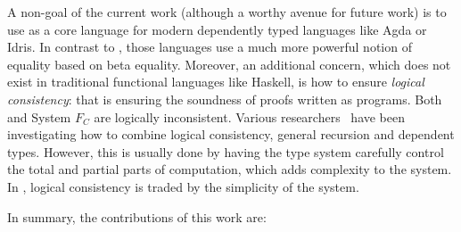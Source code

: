 A non-goal of the current work (although a worthy avenue for future
work) is to use \name as a core language for modern dependently typed
languages like Agda or Idris. In contrast to \name, those languages
use a much more powerful notion of equality based on beta equality.  Moreover, an
additional concern, which does not exist in traditional functional
languages like Haskell, is how to ensure \emph{logical consistency}:
that is ensuring the soundness of proofs written as programs. Both
\name and System $F_{C}$ are logically inconsistent.
Various researchers~\cite{zombie:popl14,zombie:thesis,Swamy2011} have been investigating how to combine logical
consistency, general recursion and dependent types. However, this is
usually done by having the type system carefully control the total and
partial parts of computation, which adds complexity to the system. In
\name, logical consistency is traded by the simplicity of the system.

\begin{comment}
In particular
the treatment of type-level computation in \name shares similar ideas
with Haskell. Although Haskell's surface language provides a rich set
of mechanisms to do type-level computation~\cite{}, the core language
lacks fundamental mechanisms todo type-level computation. Type
equality in System $F_{C}$ is, like in \name, purely syntactic (modulo
alpha-conversion).
\end{comment}

\begin{comment}
 and there is no type-level
abstraction. In other words in Haskell, mechanisms such as type
classes and type families

Although it may seem that forcing each step of computation 
at the type-level to be explicit will prevent convinient use of 
type-level computation.

Point about the treatment of type-level computation in Haskell. Haskell's
core language has type applications, but no type-level lambda. Equality 
is syntactic modulo alpha-conversion. This design choice was rooted in the 
desire to support Hindley-Milner type-inference... 
\end{comment}

In summary, the contributions of this work are:

